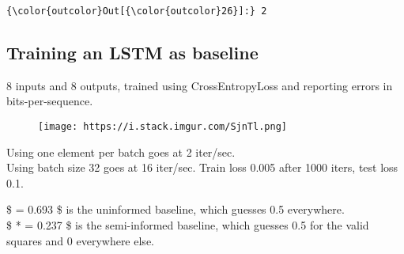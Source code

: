 \documentclass[11pt]{article}
\makeatletter
\def\maxwidth{\ifdim\Gin@nat@width>\linewidth\linewidth
    \else\Gin@nat@width\fi}
\let\Oldincludegraphics\includegraphics
\renewcommand{\includegraphics}[1]{\Oldincludegraphics[width=.8\maxwidth]{#1}}
\makeatother
\begin{document}
\begin{Verbatim}[commandchars=\\\{\}]
{\color{outcolor}Out[{\color{outcolor}26}]:} 2
\end{Verbatim}
            
    \subsection{Training an LSTM as
baseline}\label{training-an-lstm-as-baseline}

8 inputs and 8 outputs, trained using CrossEntropyLoss and reporting
errors in bits-per-sequence.

\begin{figure}
\centering
\texttt{[image: https://i.stack.imgur.com/SjnTl.png]}
\caption{}
\end{figure}

    Using one element per batch goes at 2 iter/sec.\\
Using batch size 32 goes at 16 iter/sec. Train loss 0.005 after 1000
iters, test loss 0.1.

\$  = 0.693 \$ is the uninformed baseline, which guesses 0.5
everywhere.\\
\$  *  = 0.237 \$ is the semi-informed baseline,
which guesses 0.5 for the valid squares and 0 everywhere else.
\end{document}
